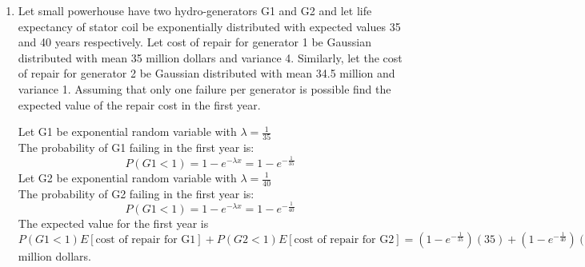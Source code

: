 \documentclass[12pt]{article}
\begin{document}
\begin{enumerate}
    \item Let small powerhouse have two hydro-generators G1 and G2 and let life expectancy of stator coil be exponentially distributed with expected values 35 and 40 years respectively. Let cost of repair for generator 1 be Gaussian distributed with mean 35 million dollars and variance 4. Similarly, let the cost of repair for generator 2 be Gaussian distributed with mean 34.5 million and variance 1. Assuming that only one failure per generator is possible find the expected value of the repair cost in the first year.

    Let G1 be exponential random variable with $\lambda = \frac{1}{35}$ \\
    The probability of G1 failing in the first year is:
    \begin{equation*}
        P(G1 < 1) = 1 - e^{-\lambda x} = 1 - e^{-\frac{1}{35}}
    \end{equation*}
    Let G2 be exponential random variable with $\lambda = \frac{1}{40}$ \\
    The probability of G2 failing in the first year is:
    \begin{equation*}
        P(G1 < 1) = 1 - e^{-\lambda x} = 1 - e^{-\frac{1}{40}}
    \end{equation*}
    The expected value for the first year is $P(G1 < 1) E[\text{cost of repair for G1}] + P(G2 < 1) E[\text{cost of repair for G2}] = (1 - e^{-\frac{1}{35}})(35) + (1 - e^{-\frac{1}{40}})(34.5) \approx 1.84$ million dollars.
\end{enumerate}
\end{document}
